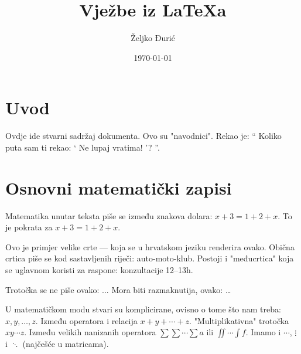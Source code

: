 \documentclass[12pt]{scrartcl}
\begin{document}
    \title{Vježbe iz \LaTeX a}
    \author{Željko Đurić}
    \date{\today}
    \maketitle
    \section{Uvod}
        Ovdje ide stvarni sadržaj dokumenta.
        Ovo su "navodnici".
        Rekao je:
        \enquote {
            Koliko puta sam ti rekao:
                \enquote {
                    Ne lupaj vratima!
                }?
        }.
    \section{Osnovni matematički zapisi}
        Matematika unutar teksta piše se između znakova dolara: $x + 3 = 1 + 2 + x$.
        To je pokrata za \(x + 3 = 1 + 2 + x\). %

        Ovo je primjer velike crte --- koja se u hrvatskom jeziku renderira ovako.
        Obična crtica piše se kod sastavljenih riječi: auto-moto-klub.
        Postoji i "međucrtica" koja se uglavnom koristi za raspone: konzultacije 12--13h.

        Trotočka se ne piše ovako: ... Mora biti razmaknutija, ovako: \ldots

        U matematičkom modu stvari su komplicirane, ovisno o tome što nam treba: $x,y,\dotsc,z$.
        Između operatora i relacija $x+y+\dotsb+z$.
        "Multiplikativna" trotočka $xy\dotsm z$.
        Između velikih nanizanih operatora $\sum\sum\dotsi\sum a$ ili $\iint\dotsi\int f$.
        Imamo i $\cdots$, $\vdots$ i $\ddots$ (najčešće u matricama).
\end{document}
